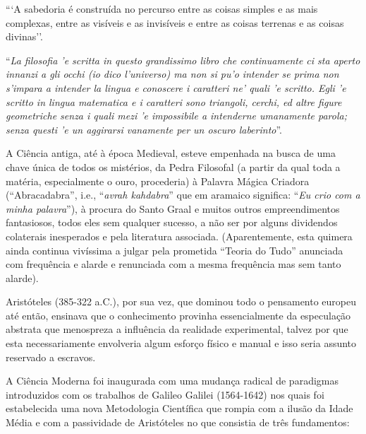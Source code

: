 \begin{citacao}
```A sabedoria é construída no percurso entre as coisas simples e as mais complexas, entre as visíveis e as invisíveis e entre as coisas terrenas e as coisas divinas''.


    ``\textit{La filosofia 'e scritta in questo grandissimo libro che continuamente ci sta aperto innanzi a gli occhi (io dico l'universo) ma non si pu'o intender se prima non s'impara a intender la lingua e conoscere i caratteri ne' quali 'e scritto. Egli 'e scritto in lingua matematica e i caratteri sono triangoli, cerchi, ed altre figure geometriche senza i quali mezi 'e impossibile a intenderne umanamente parola; senza questi 'e un aggirarsi vanamente per un oscuro laberinto}''.

\end{citacao}

    A Ciência antiga, até à época Medieval, esteve empenhada na busca de uma chave única de todos os mistérios, da Pedra Filosofal (a partir da qual toda a matéria, especialmente o ouro, procederia) à Palavra Mágica Criadora (``Abracadabra'', i.e., ``\textit{avrah kahdabra}'' que em aramaico significa: ``\textit{Eu crio com a minha palavra}''), à procura do Santo Graal e muitos outros empreendimentos fantasiosos, todos eles sem qualquer sucesso, a não ser por alguns dividendos colaterais inesperados e pela literatura associada. (Aparentemente, esta quimera ainda continua vivíssima a julgar pela prometida ``Teoria do Tudo'' anunciada com frequência e alarde e renunciada com a mesma frequência mas sem tanto alarde).

    Aristóteles (385-322 a.C.), por sua vez, que dominou todo o pensamento europeu até então, ensinava que o conhecimento provinha essencialmente da especulação abstrata que menospreza a influência da realidade experimental, talvez por que esta necessariamente envolveria algum esforço físico e manual e isso seria assunto reservado a escravos.

    A Ciência Moderna foi inaugurada com uma mudança radical de paradigmas introduzidos com os trabalhos de Galileo Galilei (1564-1642) nos quais foi estabelecida uma nova Metodologia Científica que rompia com a ilusão da Idade Média e com a passividade de Aristóteles no que consistia de três fundamentos:

